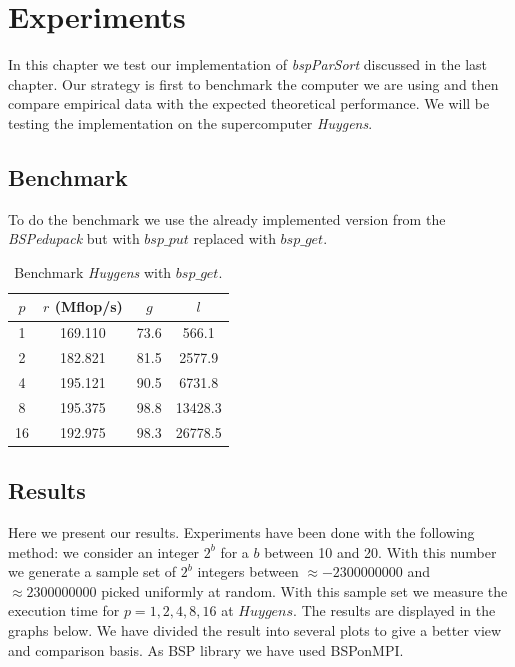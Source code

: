 \documentclass[a4paper,12pt,article]{memoir}
\theoremstyle{plain}
\theoremstyle{definition}
\theoremstyle{remark}
\theoremstyle{plain}
\theoremstyle{remark}
\begin{document}
\chapter{Experiments}
In this chapter we test our implementation of \textit{bspParSort} discussed in the last chapter. Our strategy is first to benchmark the computer we are using and then compare empirical data with the expected theoretical performance. We will be testing the implementation on the supercomputer \textit{Huygens}. 
\section{Benchmark}
To do the benchmark we use the already implemented version from the \textit{BSPedupack} but with $bsp\_put$ replaced with $bsp\_get$. 
\begin{table}
\label{table:benchgetHuygens}
\begin{center}
\begin{tabular}{|c|c|c|c|}
\hline 
$p$ & $r$ (Mflop/s) & $g$ & $l$ \\ 
\hline 
1 & 169.110 & 73.6 & 566.1 \\ 
\hline 
2 & 182.821 & 81.5 & 2577.9 \\ 
\hline
4 & 195.121 & 90.5 & 6731.8 \\
\hline
8 & 195.375 & 98.8 & 13428.3 \\
\hline
16 & 192.975 & 98.3 & 26778.5\\
\hline
\end{tabular}
\caption{Benchmark \textit{Huygens} with $bsp\_ get$.}
\end{center}
\end{table}

\section{Results}
Here we present our results. Experiments have been done with the following method: we consider an integer $2^b$ for a $b$ between 10 and 20. With this number we generate a sample set of $2^b$ integers between $\approx -2300000000$ and $\approx 2300000000$ picked uniformly at random. With this sample set we measure the execution time for $p=1,2,4,8,16$ at $Huygens$. The results are displayed in the graphs below. We have divided the result into several plots to give a better view and comparison basis. As BSP library we have used BSPonMPI. 
\end{document}
